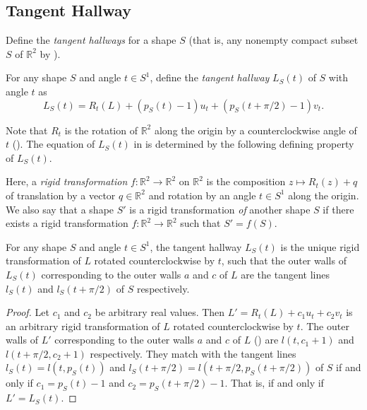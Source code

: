 \subsection{Tangent Hallway}

Define the \emph{tangent hallways} for a shape \(S\) (that is, any nonempty compact subset \(S\) of \(\mathbb{R}^2\) by ).

\begin{definition}

For any shape \(S\) and angle \(t \in S^1\), define the \emph{tangent hallway} \(L_S(t)\) of \(S\) with angle \(t\) as
\[
L_S(t) = R_t(L) + (p_S(t) - 1)  u_t + (p_S(t + \pi/2) - 1) v_t.
\]

\label{def:tangent-hallway}
\end{definition}

Note that \(R_t\) is the rotation of \(\mathbb{R}^2\) along the origin by a counterclockwise angle of \(t\) (). The equation of \(L_S(t)\) in  is determined by the following defining property of \(L_S(t)\).

\begin{definition}

Here, a \emph{rigid transformation} \(f : \mathbb{R}^2 \to \mathbb{R}^2\) on \(\mathbb{R}^2\) is the composition \(z \mapsto R_t(z) + q\) of translation by a vector \(q \in \mathbb{R}^2\) and rotation by an angle \(t \in S^1\) along the origin. We also say that a shape \(S'\) is a rigid transformation \emph{of} another shape \(S\) if there exists a rigid transformation \(f : \mathbb{R}^2 \to \mathbb{R}^2\) such that \(S' = f(S)\).

\label{def:rigid-transformation}
\end{definition}

\begin{proposition}

For any shape \(S\) and angle \(t \in S^1\), the tangent hallway \(L_S(t)\) is the unique rigid transformation of \(L\) rotated counterclockwise by \(t\), such that the outer walls of \(L_S(t)\) corresponding to the outer walls \(a\) and \(c\) of \(L\) are the tangent lines \(l_S(t)\) and \(l_S(t + \pi/2)\) of \(S\) respectively.

\label{pro:tangent-hallway}
\end{proposition}

\begin{proof}
Let \(c_1\) and \(c_2\) be arbitrary real values. Then \(L' = R_t(L) + c_1 u_t + c_2 v_t\) is an arbitrary rigid transformation of \(L\) rotated counterclockwise by \(t\). The outer walls of \(L'\) corresponding to the outer walls \(a\) and \(c\) of \(L\) () are \(l(t, c_1 + 1)\) and \(l(t + \pi/2, c_2 + 1)\) respectively. They match with the tangent lines \(l_S(t) = l(t, p_S(t))\) and \(l_S(t + \pi/2) = l(t + \pi/2, p_S(t + \pi/2))\) of \(S\) if and only if \(c_1 = p_S(t) - 1\) and \(c_2 = p_S(t + \pi/2) - 1\). That is, if and only if \(L' = L_S(t)\).
\end{proof}

